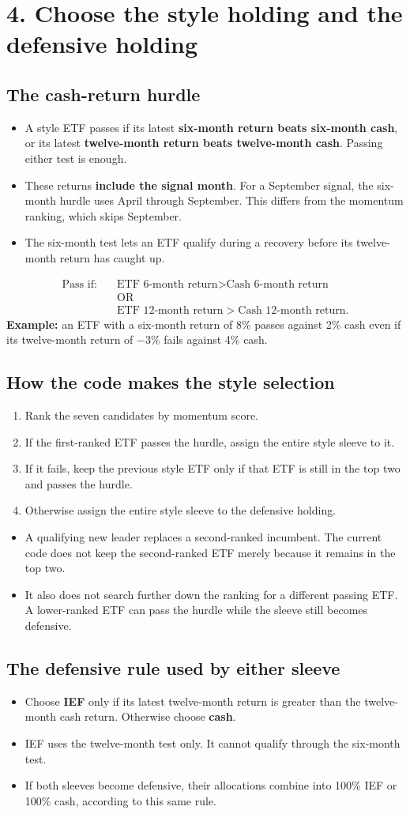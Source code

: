 \documentclass[11pt,letterpaper]{article}
\newcommand{\topic}[1]{\Needspace{5\baselineskip}\subsection*{#1}}
\newcommand{\word}[1]{\text{#1}}
\newcommand{\guidepage}[1]{\clearpage\section*{#1}}
\begin{document}
\guidepage{4. Choose the style holding and the defensive holding}
\label{style-rules}
\topic{The cash-return hurdle}
\begin{itemize}
\item A style ETF passes if its latest \textbf{six-month return beats six-month cash}, or its latest \textbf{twelve-month return beats twelve-month cash}. Passing either test is enough.
\item These returns \textbf{include the signal month}. For a September signal, the six-month hurdle uses April through September. This differs from the momentum ranking, which skips September.
\item The six-month test lets an ETF qualify during a recovery before its twelve-month return has caught up.
\end{itemize}
\[
\begin{aligned}
\word{Pass if:}\quad&\word{ETF 6-month return}>\word{Cash 6-month return}\\
&\word{OR}\\
&\word{ETF 12-month return}>\word{Cash 12-month return}.
\end{aligned}
\]
\textbf{Example:} an ETF with a six-month return of 8\% passes against 2\% cash even if its twelve-month return of $-3\%$ fails against 4\% cash.

\topic{How the code makes the style selection}
\begin{enumerate}
\item Rank the seven candidates by momentum score.
\item If the first-ranked ETF passes the hurdle, assign the entire style sleeve to it.
\item If it fails, keep the previous style ETF only if that ETF is still in the top two and passes the hurdle.
\item Otherwise assign the entire style sleeve to the defensive holding.
\end{enumerate}
\begin{itemize}
\item A qualifying new leader replaces a second-ranked incumbent. The current code does not keep the second-ranked ETF merely because it remains in the top two.
\item It also does not search further down the ranking for a different passing ETF. A lower-ranked ETF can pass the hurdle while the sleeve still becomes defensive.
\end{itemize}

\topic{The defensive rule used by either sleeve}
\begin{itemize}
\item Choose \textbf{IEF} only if its latest twelve-month return is greater than the twelve-month cash return. Otherwise choose \textbf{cash}.
\item IEF uses the twelve-month test only. It cannot qualify through the six-month test.
\item If both sleeves become defensive, their allocations combine into 100\% IEF or 100\% cash, according to this same rule.
\end{itemize}
\end{document}
